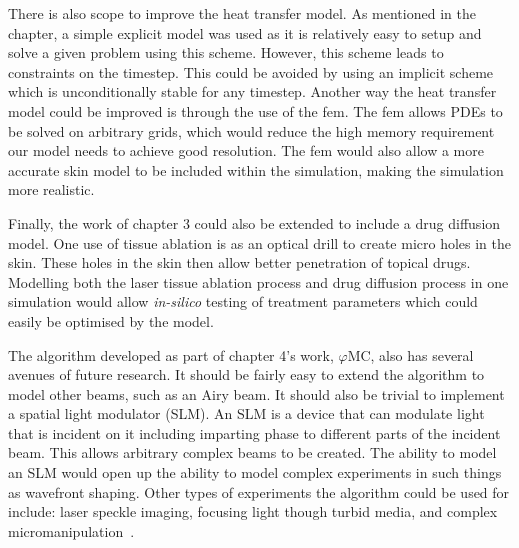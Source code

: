 There is also scope to improve the heat transfer model.
As mentioned in the chapter, a simple explicit model was used as it is relatively easy to setup and solve a given problem using this scheme.
However, this scheme leads to constraints on the timestep.
This could be avoided by using an implicit scheme which is unconditionally stable for any timestep.
Another way the heat transfer model could be improved is through the use of the \gls*{fem}.
The \gls*{fem} allows PDEs to be solved on arbitrary grids, which would reduce the high memory requirement our model needs to achieve good resolution.
The \gls*{fem} would also allow a more accurate skin model to be included within the simulation, making the simulation more realistic.

Finally, the work of chapter 3 could also be extended to include a drug diffusion model.
One use of tissue ablation is as an optical drill to create micro holes in the skin. 
These holes in the skin then allow better penetration of topical drugs.
Modelling both the laser tissue ablation process and drug diffusion process in one simulation would allow \textit{in-silico} testing of treatment parameters which could easily be optimised by the model.

\medskip

The algorithm developed as part of chapter 4's work, $\varphi$MC, also has several avenues of future research.
It should be fairly easy to extend the algorithm to model other beams, such as an Airy beam.
It should also be trivial to implement a spatial light modulator (SLM)\@.
An SLM is a device that can modulate light that is incident on it including imparting phase to different parts of the incident beam.
This allows arbitrary complex beams to be created.
The ability to model an SLM would open up the ability to model complex experiments in such things as wavefront shaping.
Other types of experiments the algorithm could be used for include: laser speckle imaging, focusing light though turbid media, and complex micromanipulation~\cite{vellekoop2007focusing,horstmeyer2015guidestar,vcivzmar2010situ}.

\medskip

